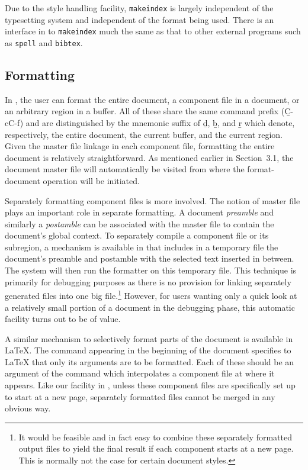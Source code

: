 Due to the style handling facility, \verb|makeindex| is largely independent
of the typesetting system and independent of the format being used.
There is an interface in {\TM} to \verb|makeindex| much the same as that to
other external programs such as \verb|spell| and \verb|bibtex|.


\subsection{Formatting}
In {\TM}, the user can format the entire document, a component file 
in a document, or an arbitrary region in a buffer.
All of these share the same command prefix ({\b C-c{\s}C-f})
and are distinguished by the mnemonic suffix of
{\b d}, {\b b}, and {\b r} which denote, respectively,
the entire document, the current buffer, and the current region.
Given the master file linkage in each component file,
formatting the entire document is relatively straightforward.
As mentioned earlier in Section~3.1, the document master file will automatically
be visited from where the format-document operation will be initiated.

Separately formatting component files is more involved.
The notion of master file plays an important role in separate formatting.
A document {\it preamble\/} and similarly a {\it postamble\/} can be
associated with the master file to contain the document's global context.
To separately compile a component file or its subregion, 
a mechanism is available in {\TM} that
includes in a temporary file the document's preamble and postamble
with the selected text inserted in between.  The system will then run
the formatter on this temporary file.
This technique is primarily for debugging purposes as
there is no provision for linking separately generated {\dvi} files into
one big {\dvi} file.\footnote{It would be feasible and in fact easy
to combine these separately formatted output files to yield the
final result if each component starts at a new page.  This is normally not
the case for certain document styles.}
However, for users wanting only a quick look at a
relatively small portion of a document in the debugging phase, this automatic
facility turns out to be of value.

A similar mechanism to selectively format parts of the document is available
in {\LaTeX}.  The command \verb|| appearing in the beginning
of the document specifies to {\LaTeX} that
only its arguments are to be formatted.  Each of these should be 
an argument of the command \verb|| which interpolates a component file
at where it appears.  Like our facility in {\TM},
unless these component files are specifically
set up to start at a new page, separately formatted files cannot be merged
in any obvious way.

